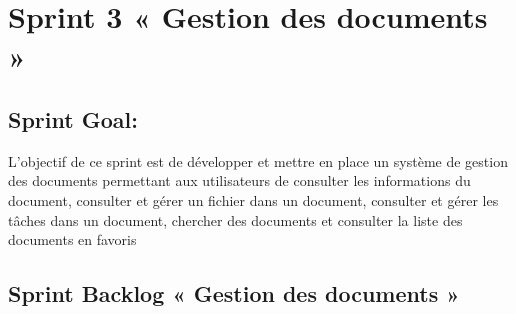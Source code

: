 \section{Sprint 3 « Gestion des documents »}
\subsection{Sprint Goal:}

L'objectif de ce sprint est de développer et mettre en place un système de gestion des documents permettant aux utilisateurs de consulter les informations du document, consulter et gérer un fichier dans un document, consulter et gérer les tâches dans un document, chercher des documents et consulter la liste des documents en favoris

\pagebreak

\subsection{Sprint Backlog « Gestion des documents »}


